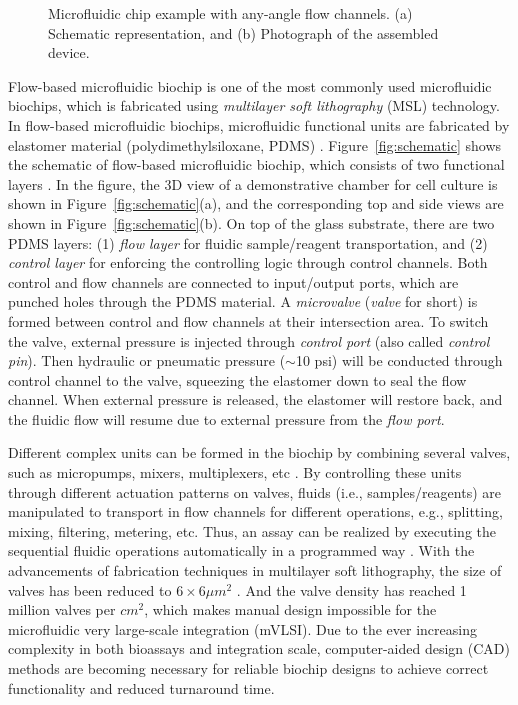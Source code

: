 \documentclass[journal]{IEEEtran}
\begin{document}
\begin{figure}[htbp]
{\begin{minipage}[b]{0.8\columnwidth}
\label{fig:aaexample:b}
\end{minipage}%
}%
\vspace{-0.2cm}
\caption{Microfluidic chip example with any-angle flow channels. (a) Schematic representation, and (b) Photograph of the assembled device. }
\label{fig:aaexample}
\vspace{-0.25cm}
\end{figure}

Flow-based microfluidic biochip is one of the most commonly used microfluidic biochips, which is fabricated using {\em multilayer soft lithography} (MSL) technology. 
In flow-based microfluidic biochips, microfluidic functional units are fabricated by elastomer material (polydimethylsiloxane, PDMS) \cite{Thorsen:2002ec,Rogers:2005vu}. 
Figure~\ref{fig:schematic} shows the schematic of flow-based microfluidic biochip, which consists of two functional layers \cite{QinRu:2016}. 
In the figure, the 3D view of a demonstrative chamber for cell culture is shown in Figure~\ref{fig:schematic}(a), and the corresponding top and side views are shown in Figure~\ref{fig:schematic}(b). 
On top of the glass substrate, there are two PDMS layers: (1) {\em flow layer} for fluidic sample/reagent transportation, and (2) {\em control layer} for enforcing the controlling logic through control channels. Both control and flow channels are connected to input/output ports, which are punched holes through the PDMS material.
A {\em microvalve} ({\em valve} for short) is formed between control and flow channels at their intersection area.
To switch the valve, external pressure is injected through {\em control port} (also called {\em control pin}). 
Then hydraulic or pneumatic pressure ($\sim$10 psi) will be conducted through control channel to the valve, squeezing the elastomer down to seal the flow channel. 
When external pressure is released, the elastomer will restore back, 
and the fluidic flow will resume due to external pressure from the {\em flow port}.

Different complex units can be formed in the biochip by combining several valves, such as micropumps, 
mixers, multiplexers, etc \cite{Mark:2010fk}. By controlling these units 
through different actuation patterns on valves, fluids (i.e., samples/reagents) are 
manipulated to transport in flow channels for different operations, 
e.g., splitting, mixing, filtering, metering, etc. Thus, an assay can be realized by executing 
the sequential fluidic operations automatically in a programmed way \cite{Squires:2005vb}.
With the advancements of fabrication techniques in multilayer soft 
lithography, the size of valves has been reduced to 
$6 \times 6\mu m^2$ \cite{Unger:2000gm,Araci:2012gl}. And the valve density 
has reached 1 million valves per $cm^2$, which makes manual design impossible
for the microfluidic very large-scale integration (mVLSI). 
Due to the ever increasing complexity in both bioassays and integration scale, 
computer-aided design (CAD) methods are becoming necessary 
for reliable biochip designs to achieve correct functionality and 
reduced turnaround time.
\end{document}
